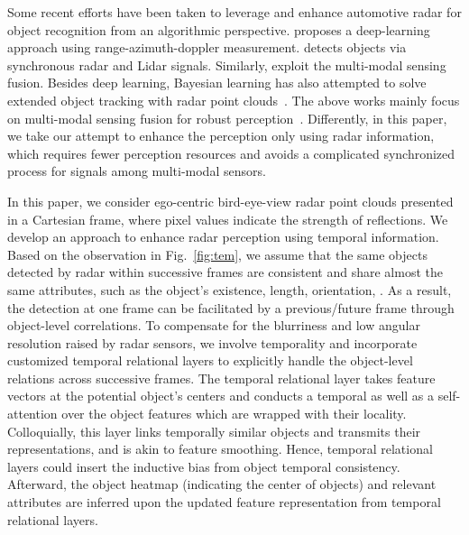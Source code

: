 \documentclass[10pt,twocolumn,letterpaper]{article}
\begin{document}
Some recent efforts have been taken to leverage and enhance automotive radar for object recognition from an algorithmic perspective. \cite{major2019vehicle} proposes a deep-learning approach using range-azimuth-doppler measurement. \cite{qian2021robust} detects objects via synchronous radar and Lidar signals. Similarly, \cite{yang2020radarnet,lim2019radar} exploit the multi-modal sensing fusion. Besides deep learning, Bayesian learning has also attempted to solve extended object tracking with radar point clouds~\cite{yao2021extended,xia2021learning}. The above works mainly focus on multi-modal sensing fusion for robust perception~\cite{qian2021robust,yang2020radarnet,lim2019radar}. Differently, in this paper, we take our attempt to enhance the perception only using radar information, which requires fewer perception resources and avoids a complicated synchronized process for signals among multi-modal sensors.



In this paper, we consider ego-centric bird-eye-view radar point clouds presented in a Cartesian frame, where pixel values indicate the strength of reflections. We develop an approach to enhance radar perception using temporal information. Based on the observation in Fig.~\ref{fig:tem}, we assume that the same objects detected by radar within successive frames are consistent and share almost the same attributes, such as the object's existence, length, orientation, \etc. As a result, the detection at one frame can be facilitated by a previous/future frame through object-level correlations. To compensate for the blurriness and low angular resolution raised by radar sensors, we involve temporality and incorporate customized temporal relational layers to explicitly handle the object-level relations across successive frames. The temporal relational layer takes feature vectors at the potential object's centers and conducts a temporal as well as a self-attention over the object features which are wrapped with their locality. Colloquially, this layer links temporally similar objects and transmits their representations, and is akin to feature smoothing. Hence, temporal relational layers could insert the inductive bias from object temporal consistency. Afterward, the object heatmap (indicating the center of objects) and relevant attributes are inferred upon the updated feature representation from temporal relational layers.
\end{document}

